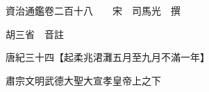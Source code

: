 










 


 
 


 

  
  
  
  
  





  
  
  
  
  
 
  

  

  
  
  



  

 
 

  
   




  

  
  


  　　資治通鑑卷二百十八　　宋　司馬光　撰

　　胡三省　音註

　　唐紀三十四【起柔兆涒灘五月至九月不滿一年】

　　肅宗文明武德大聖大宣孝皇帝上之下

